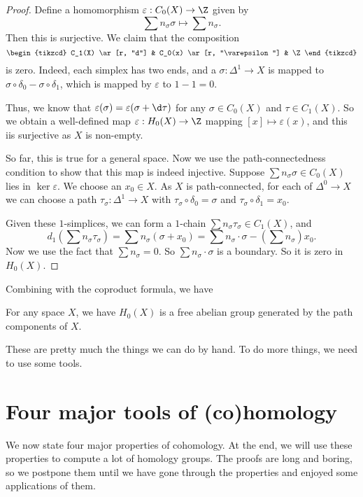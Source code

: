 \documentclass[a4paper]{article}
\theoremstyle{definition}
\begin{document}
\begin{proof}
  Define a homomorphism $\varepsilon: C_0(X) \to \Z$ given by
  \[
    \sum n_\sigma \sigma \mapsto \sum n_\sigma.
  \]
  Then this is surjective. We claim that the composition
  \[
    \begin{tikzcd}
      C_1(X) \ar[r, "d"] & C_0(x) \ar[r, "\varepsilon"] & \Z
    \end{tikzcd}
  \]
  is zero. Indeed, each simplex has two ends, and a $\sigma: \Delta^1 \to X$ is mapped to $\sigma \circ \delta_0 - \sigma \circ \delta_1$, which is mapped by $\varepsilon$ to $1 - 1 = 0$.

  Thus, we know that $\varepsilon(\sigma) = \varepsilon (\sigma + \d \tau)$ for any $\sigma \in C_0(X)$ and $\tau \in C_1(X)$. So we obtain a well-defined map $\varepsilon: H_0(X) \to \Z$ mapping $[x] \mapsto \varepsilon(x)$, and this iis surjective as $X$ is non-empty.

  So far, this is true for a general space. Now we use the path-connectedness condition to show that this map is indeed injective. Suppose $\sum n_\sigma \sigma \in C_0(X)$ lies in $\ker \varepsilon$. We choose an $x_0 \in X$. As $X$ is path-connected, for each of $\Delta^0 \to X$ we can choose a path $\tau_\sigma: \Delta^1 \to X$ with $\tau_\sigma \circ \delta_0 = \sigma$ and $\tau_\sigma \circ \delta_1 = x_0$.

  Given these $1$-simplices, we can form a $1$-chain $\sum n_\sigma \tau_\sigma \in C_1(X)$, and
  \[
    d_1\left(\sum n_\sigma \tau_\sigma\right)= \sum n_\sigma(\sigma + x_0) = \sum n_\sigma \cdot \sigma - \left(\sum n_\sigma\right) x_0.
  \]
  Now we use the fact that $\sum n_\sigma = 0$. So $\sum n_\sigma \cdot \sigma$ is a boundary. So it is zero in $H_0(X)$.
\end{proof}

Combining with the coproduct formula, we have
\begin{prop}
  For any space $X$, we have $H_0(X)$ is a free abelian group generated by the path components of $X$.
\end{prop}
These are pretty much the things we can do by hand. To do more things, we need to use some tools.

\section{Four major tools of (co)homology}
We now state four major properties of cohomology. At the end, we will use these properties to compute a lot of homology groups. The proofs are long and boring, so we postpone them until we have gone through the properties and enjoyed some applications of them.
\end{document}
